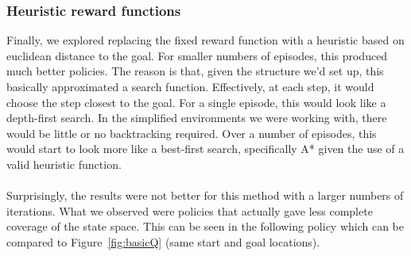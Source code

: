 \documentclass{aiaa-tc}%
\begin{document}
\subsubsection{Heuristic reward functions}
Finally, we explored replacing the fixed reward function with a
heuristic based on euclidean distance to the goal. For smaller numbers
of episodes, this produced much better policies. The reason is that,
given the structure we'd set up, this basically approximated a
search function. Effectively, at each step, it
would choose the step closest to the goal. For a single episode,
this would look like a depth-first search. In the simplified
environments we were working with, there would be little or no
backtracking required. Over a number of episodes, this would start to
look more like a best-first search, specifically A* given the use of a
valid heuristic function. \\ \\
Surprisingly, the results were not better for this method with a larger
numbers of iterations. What we observed were policies that actually
gave less complete coverage of the state space. This can be seen in
the following policy which can be compared to Figure~\ref{fig:basicQ} (same
start and goal locations).

\vspace{.3in}
\end{document}
